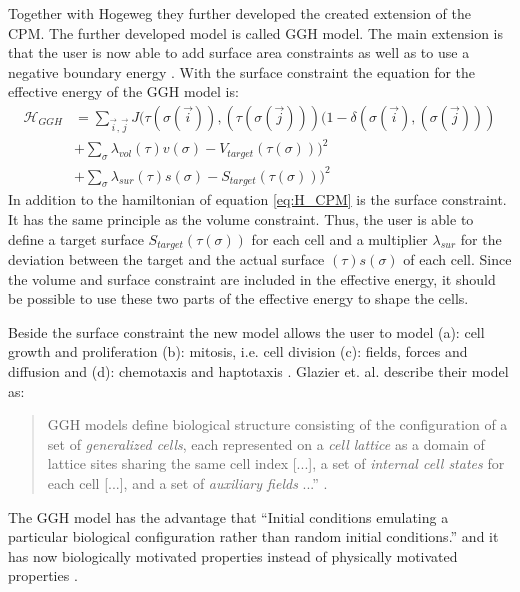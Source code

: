 Together with Hogeweg they further developed the created extension of the \ac{CPM}. The further developed model is called \ac{GGH} model. The main extension is that the user is now able to add surface area constraints \cite{Graner1992, Glazier1993, Glazier2007} as well as to use a negative boundary energy \cite{Glazier2007}. With the surface constraint the equation for the effective energy of the \ac{GGH} model is: 
\begin{equation}\label{eq:H_GGH}
\begin{split}
\mathcal{H}_{GGH} & = \sum_{\vec{i},\vec{j}}^{ }J(\tau(\sigma(\vec{i})),(\tau(\sigma(\vec{j})))(1-\delta(\sigma(\vec{i}),(\sigma(\vec{j}))) \\
		 & + \sum_{\sigma}^{}{\lambda_{vol}(\tau)v(\sigma)-V_{target}(\tau(\sigma)))^2} \\
		 & + \sum_{\sigma}^{}{\lambda_{sur}(\tau)s(\sigma)-S_{target}(\tau(\sigma)))^2}
\end{split}
\end{equation}
In addition to the hamiltonian of equation \ref{eq:H_CPM} is the surface constraint. It has the same principle as the volume constraint. Thus, the user is able to define a target surface $S_{target}(\tau(\sigma))$ for each cell and a multiplier $\lambda_{sur}$ for the deviation between the target and the actual surface $(\tau)s(\sigma)$ of each cell. Since the volume and surface constraint are included in the effective energy, it should be possible to use these two parts of the effective energy to shape the cells.


Beside the surface constraint the new model allows the user to model (a): cell growth and proliferation (b): mitosis, i.e. cell division (c): fields, forces and diffusion and (d): chemotaxis and haptotaxis \cite{Glazier2007}. \newline
Glazier et. al. describe their model as: 
\begin{quote}
GGH models define biological structure consisting of the configuration of a set of \textit{generalized cells}, each represented on a \textit{cell lattice} as a domain of lattice sites sharing the same cell index [...], a set of \textit{internal cell states} for each cell [...], and a set of \textit{auxiliary fields} ...” \cite{Glazier2007}.
\end{quote}

The \ac{GGH} model has the advantage that “Initial conditions emulating a particular biological configuration rather than random initial conditions.” \cite{Glazier2007} and it has now biologically motivated properties instead of physically motivated properties \cite{Glazier2007}. 


